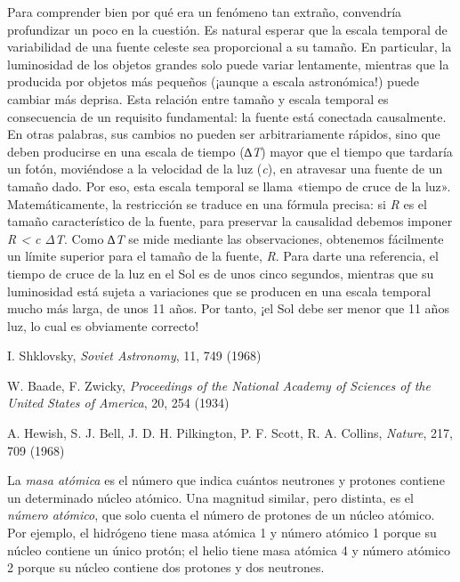 \begin{description}[style=multiline,leftmargin=2em,labelwidth=1.5em]
\item[4.]\hypertarget{note:05-04}{}Para comprender bien por qué era un fenómeno tan extraño, convendría profundizar un poco en la cuestión. Es natural esperar que la escala temporal de variabilidad de una fuente celeste sea proporcional a su tamaño. En particular, la luminosidad de los objetos grandes solo puede variar lentamente, mientras que la producida por objetos más pequeños (¡aunque a escala astronómica!) puede cambiar más deprisa. Esta relación entre tamaño y escala temporal es consecuencia de un requisito fundamental: la fuente está conectada causalmente. En otras palabras, sus cambios no pueden ser arbitrariamente rápidos, sino que deben producirse en una escala de tiempo (\emph{∆T}) mayor que el tiempo que tardaría un fotón, moviéndose a la velocidad de la luz (\emph{c}), en atravesar una fuente de un tamaño dado. Por eso, esta escala temporal se llama «tiempo de cruce de la luz». Matemáticamente, la restricción se traduce en una fórmula precisa: si \emph{R} es el tamaño característico de la fuente, para preservar la causalidad debemos imponer \emph{R \textless{} c ΔT}. Como \emph{∆T} se mide mediante las observaciones, obtenemos fácilmente un límite superior para el tamaño de la fuente, \emph{R}. Para darte una referencia, el tiempo de cruce de la luz en el Sol es de unos cinco segundos, mientras que su luminosidad está sujeta a variaciones que se producen en una escala temporal mucho más larga, de unos 11 años. Por tanto, ¡el Sol debe ser menor que 11 años luz, lo cual es obviamente correcto!

\item[5.]\hypertarget{note:05-05}{}I. Shklovsky, \emph{Soviet Astronomy}, 11, 749 (1968)

\item[6.]\hypertarget{note:05-06}{}W. Baade, F. Zwicky, \emph{Proceedings of the National Academy of Sciences of the United States of America}, 20, 254 (1934)

\item[7.]\hypertarget{note:05-07}{}A. Hewish, S. J. Bell, J. D. H. Pilkington, P. F. Scott, R. A. Collins, \emph{Nature}, 217, 709 (1968)

\item[8.]\hypertarget{note:05-08}{}La \emph{masa atómica} es el número que indica cuántos neutrones y protones contiene un determinado núcleo atómico. Una magnitud similar, pero distinta, es el \emph{número atómico}, que solo cuenta el número de protones de un núcleo atómico. Por ejemplo, el hidrógeno tiene masa atómica 1 y número atómico 1 porque su núcleo contiene un único protón; el helio tiene masa atómica 4 y número atómico 2 porque su núcleo contiene dos protones y dos neutrones.


\end{description}
